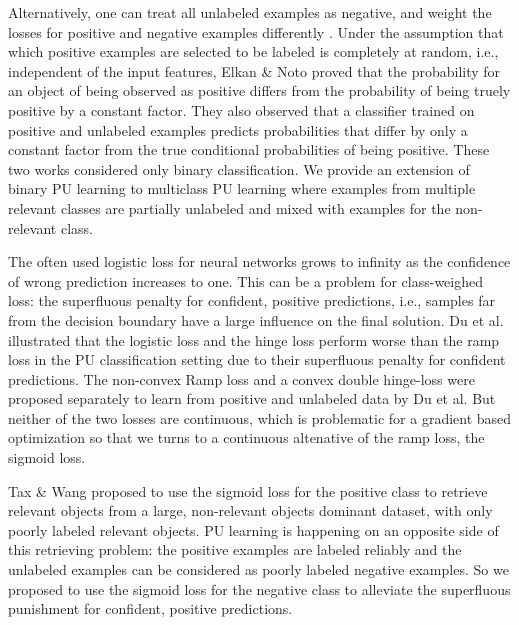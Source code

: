 Alternatively, one can treat all unlabeled examples as negative, and weight the losses for positive and negative examples differently \cite{lee2003learning}.
Under the assumption that which positive examples are selected to be labeled is completely at random, i.e., independent of the input features, Elkan \& Noto \cite{elkan2008learning} proved that the probability for an object of being observed as positive differs from the probability of being truely positive by a constant factor.
They also observed that a classifier trained on positive and unlabeled examples predicts probabilities that differ by only a constant factor from the true conditional probabilities of being positive.
These two works considered only binary classification.
We provide an extension of binary PU learning to multiclass PU learning where examples from multiple relevant classes are partially unlabeled and mixed with examples for the non-relevant class.

The often used logistic loss for neural networks grows to infinity as the confidence of wrong prediction increases to one.
This can be a problem for class-weighed loss: the superfluous penalty for confident, positive predictions, i.e., samples far from the decision boundary have a large influence on the final solution. \cite{tax2016class}
Du et al. \cite{du2015convex} illustrated that the logistic loss and the hinge loss perform worse than the ramp loss in the PU classification setting due to their superfluous penalty for confident predictions.
The non-convex Ramp loss \cite{du2014analysis} and a convex double hinge-loss \cite{du2015convex} were proposed separately to learn from positive and unlabeled data by Du et al.
But neither of the two losses are continuous, which is problematic for a gradient based optimization so that we turns to a continuous altenative of the ramp loss, the sigmoid loss.

Tax \& Wang \cite{tax2016class} proposed to use the sigmoid loss for the positive class to retrieve relevant objects from a large, non-relevant objects dominant dataset, with only poorly labeled relevant objects.
PU learning is happening on an opposite side of this retrieving problem: the positive examples are labeled reliably and the unlabeled examples can be considered as poorly labeled negative examples.
So we proposed to use the sigmoid loss\cite{tax2016class} for the negative class to alleviate the superfluous punishment for confident, positive predictions.

